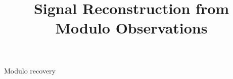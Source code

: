 \documentclass{article}
\title{Signal Reconstruction from Modulo Observations}
\numberwithin{equation}{section}
\begin{document}
	\maketitle
	\ninept
	
	\begin{keywords}
	Modulo recovery 
	\end{keywords}
	
	
	
	
	
	
	
%	
	{{
	\footnotesize
	
	
	}
	}
	
\end{document}
